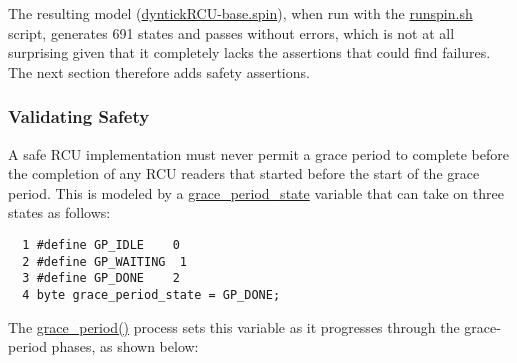  \QuickQuizEnd

The resulting model (\url{dyntickRCU-base.spin}),
when run with the
\url{runspin.sh} script,
generates 691 states and
passes without errors, which is not at all surprising given that
it completely lacks the assertions that could find failures.
The next section therefore adds safety assertions.

\subsubsection{Validating Safety}
\label{app:formal:Validating Safety}

A safe RCU implementation must never permit a grace period to
complete before the completion of any RCU readers that started
before the start of the grace period.
This is modeled by a \url{grace_period_state} variable that
can take on three states as follows:

\vspace{5pt}
\begin{minipage}[t]{\columnwidth}
\begin{verbatim}
  1 #define GP_IDLE    0
  2 #define GP_WAITING  1
  3 #define GP_DONE    2
  4 byte grace_period_state = GP_DONE;
\end{verbatim}
\end{minipage}
\vspace{5pt}

The \url{grace_period()} process sets this variable as it
progresses through the grace-period phases, as shown below:

